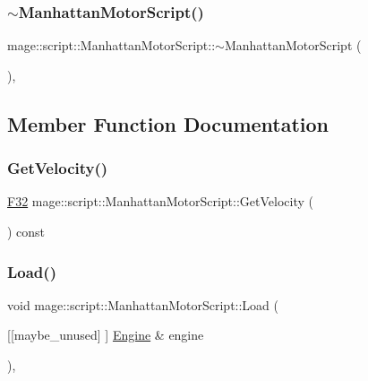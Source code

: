 \subsubsection{\texorpdfstring{$\sim$\+Manhattan\+Motor\+Script()}{~ManhattanMotorScript()}}
{\footnotesize\ttfamily mage\+::script\+::\+Manhattan\+Motor\+Script\+::$\sim$\+Manhattan\+Motor\+Script (\begin{DoxyParamCaption}{ }\end{DoxyParamCaption})\hspace{0.3cm}{\ttfamily [virtual]}, {\ttfamily [default]}}



\subsection{Member Function Documentation}
\hypertarget{classmage_1_1script_1_1_manhattan_motor_script_a2f73545bf2fb507375251d530054ac9b}{}\label{classmage_1_1script_1_1_manhattan_motor_script_a2f73545bf2fb507375251d530054ac9b} 
\subsubsection{\texorpdfstring{Get\+Velocity()}{GetVelocity()}}
{\footnotesize\ttfamily \hyperlink{namespacemage_aa97e833b45f06d60a0a9c4fc22ae02c0}{F32} mage\+::script\+::\+Manhattan\+Motor\+Script\+::\+Get\+Velocity (\begin{DoxyParamCaption}{ }\end{DoxyParamCaption}) const\hspace{0.3cm}{\ttfamily [noexcept]}}

\hypertarget{classmage_1_1script_1_1_manhattan_motor_script_ac93b09e8f82932f7071b1f591a8004e9}{}\label{classmage_1_1script_1_1_manhattan_motor_script_ac93b09e8f82932f7071b1f591a8004e9} 
\subsubsection{\texorpdfstring{Load()}{Load()}}
{\footnotesize\ttfamily void mage\+::script\+::\+Manhattan\+Motor\+Script\+::\+Load (\begin{DoxyParamCaption}\item[{\mbox{[}\mbox{[}maybe\+\_\+unused\mbox{]} \mbox{]} \hyperlink{classmage_1_1_engine}{Engine} \&}]{engine }\end{DoxyParamCaption})\hspace{0.3cm}{\ttfamily [override]}, {\ttfamily [virtual]}}

